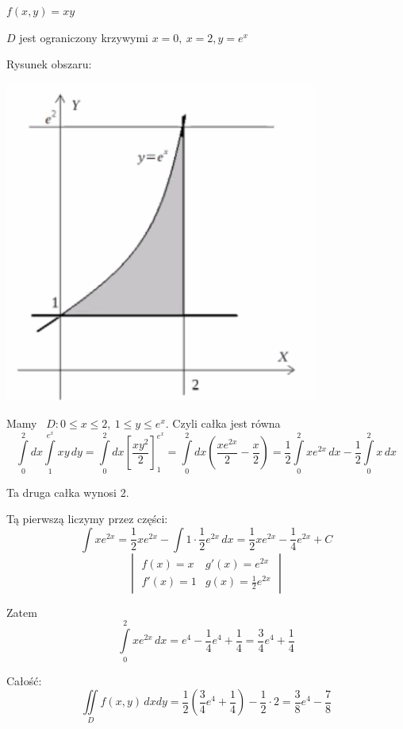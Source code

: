 \begin{przyklad}

$ f(x,y) = xy $

$D$ jest ograniczony krzywymi $ x=0, \ x=2, y=e^x $
\medskip

\begin{center}
    Rysunek obszaru:
    
    \includegraphics[scale=0.7]{img/krzywetrojkat.png}
\end{center}

Mamy \ $ D: 0 \leq x \leq 2, \ 1 \leq y \leq e^x $. Czyli całka jest równa
\[ \int\limits_{0}^{2} dx \int\limits_{1}^{e^x} xy \, dy = \int\limits_{0}^{2} dx \left[ \frac{xy^2}{2} \right]_{1}^{e^x} 
= \int\limits_{0}^{2} dx \left( \frac{xe^{2x}}{2} - \frac{x}{2} \right) = \frac{1}{2} \int\limits_{0}^{2} xe^{2x}\, dx - \frac{1}{2} \int\limits_{0}^{2} x\, dx \]

Ta druga całka wynosi 2.

Tą pierwszą liczymy przez części:
\[ \int xe^{2x} = \frac{1}{2} xe^{2x} - \int 1 \cdot \frac{1}{2} e^{2x} \, dx = \frac{1}{2} xe^{2x} - \frac{1}{4} e^{2x} + C \]
\[ \begin{vmatrix}
    f(x) = x & g'(x) = e^{2x} \\
    f'(x) = 1 & g(x) = \frac{1}{2}e^{2x} 
\end{vmatrix} \]

Zatem
\[ \int\limits_{0}^{2} xe^{2x} \, dx = e^4 - \frac{1}{4}e^4 + \frac{1}{4} = \frac{3}{4}e^4 + \frac{1}{4} \]

Całość:
\[ \iint\limits_D f(x,y) \, dxdy = \frac{1}{2} \left( \frac{3}{4}e^4 + \frac{1}{4} \right) - \frac{1}{2} \cdot 2 = \frac{3}{8}e^4 - \frac{7}{8} \]
\end{przyklad}


